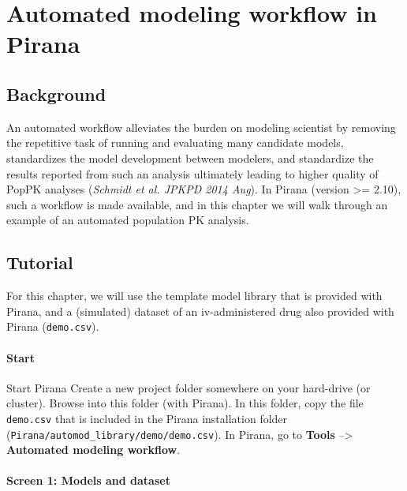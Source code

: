 \chapter{Automated modeling workflow in
Pirana}

\section{Background}\label{background}

An automated workflow alleviates the burden on modeling scientist by
removing the repetitive task of running and evaluating many candidate
models, standardizes the model development between modelers, and
standardize the results reported from such an analysis ultimately
leading to higher quality of PopPK analyses (\emph{Schmidt et al. JPKPD
2014 Aug}). In Pirana (version \textgreater{}= 2.10), such a workflow is
made available, and in this chapter we will walk through an example of
an automated population PK analysis.

\section{Tutorial}

For this chapter, we will use the template model library that is
provided with Pirana, and a (simulated) dataset of an iv-administered
drug also provided with Pirana (\texttt{demo.csv}).

\subsubsection*{Start}

Start Pirana Create a new project folder somewhere on your hard-drive
(or cluster). Browse into this folder (with Pirana). In this folder,
copy the file \texttt{demo.csv} that is included in the Pirana
installation folder (\texttt{Pirana/automod\_library/demo/demo.csv}). In
Pirana, go to \textbf{Tools} --\textgreater{} \textbf{Automated modeling
workflow}.


\subsubsection*{Screen 1: Models and
dataset}

